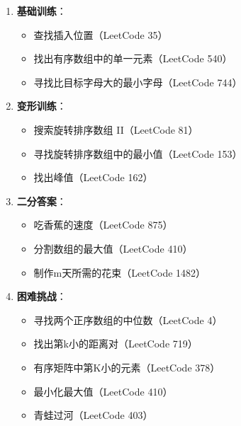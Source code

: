 \documentclass[12pt,a4paper]{article}
\begin{document}
	\begin{enumerate}[leftmargin=*]
		\item \textbf{基础训练}：
		\begin{itemize}
			\item 查找插入位置（LeetCode 35）
			\item 找出有序数组中的单一元素（LeetCode 540）
			\item 寻找比目标字母大的最小字母（LeetCode 744）
		\end{itemize}
		\item \textbf{变形训练}：
		\begin{itemize}
			\item 搜索旋转排序数组 II（LeetCode 81）
			\item 寻找旋转排序数组中的最小值（LeetCode 153）
			\item 找出峰值（LeetCode 162）
		\end{itemize}
		\item \textbf{二分答案}：
		\begin{itemize}
			\item 吃香蕉的速度（LeetCode 875）
			\item 分割数组的最大值（LeetCode 410）
			\item 制作m天所需的花束（LeetCode 1482）
		\end{itemize}
		\item \textbf{困难挑战}：
		\begin{itemize}
			\item 寻找两个正序数组的中位数（LeetCode 4）
			\item 找出第k小的距离对（LeetCode 719）
			\item 有序矩阵中第K小的元素（LeetCode 378）
			\item 最小化最大值（LeetCode 410）
			\item 青蛙过河（LeetCode 403）
		\end{itemize}
	\end{enumerate}
	
\end{document}
